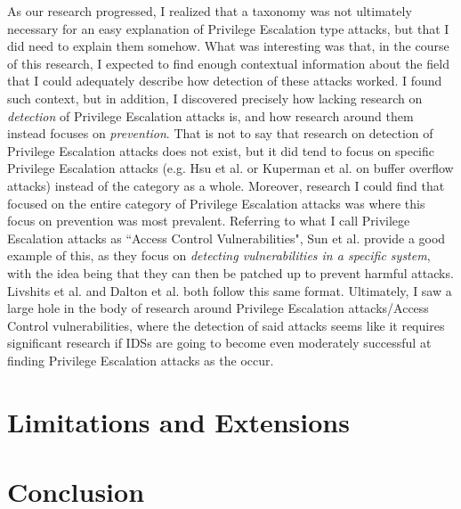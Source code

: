 \documentclass{acm_proc_article-sp}
\begin{document}
    	As our research progressed, I realized that a taxonomy was not ultimately necessary for an easy explanation of Privilege Escalation type attacks, but that I did need to explain them somehow. What was interesting was that, in the course of this research, I expected to find enough contextual information about the field that I could adequately describe how detection of these attacks worked. I found such context, but in addition, I discovered precisely how lacking research on \emph{detection} of Privilege Escalation attacks is, and how research around them instead focuses on \emph{prevention}. That is not to say that research on detection of Privilege Escalation attacks does not exist, but it did tend to focus on specific Privilege Escalation attacks (e.g. Hsu et al. \cite{Hsu2006} or Kuperman et al. \cite{Kuperman2005} on buffer overflow attacks) instead of the category as a whole. Moreover, research I could find that focused on the entire category of Privilege Escalation attacks was where this focus on prevention was most prevalent. Referring to what I call Privilege Escalation attacks as ``Access Control Vulnerabilities", Sun et al. \cite{Sun2011} provide a good example of this, as they focus on \emph{detecting vulnerabilities in a specific system}, with the idea being that they can then be patched up to prevent harmful attacks. Livshits et al. \cite{Livshits2005} and Dalton et al. \cite{Dalton2009} both follow this same format. Ultimately, I saw a large hole in the body of research around Privilege Escalation attacks/Access Control vulnerabilities, where the detection of said attacks seems like it requires significant research if IDSs are going to become even moderately successful at finding Privilege Escalation attacks as the occur.

\section{Limitations and Extensions}
\section{Conclusion}

	

{}  %
\nocite{*}
%
%
\balancecolumns
\end{document}

